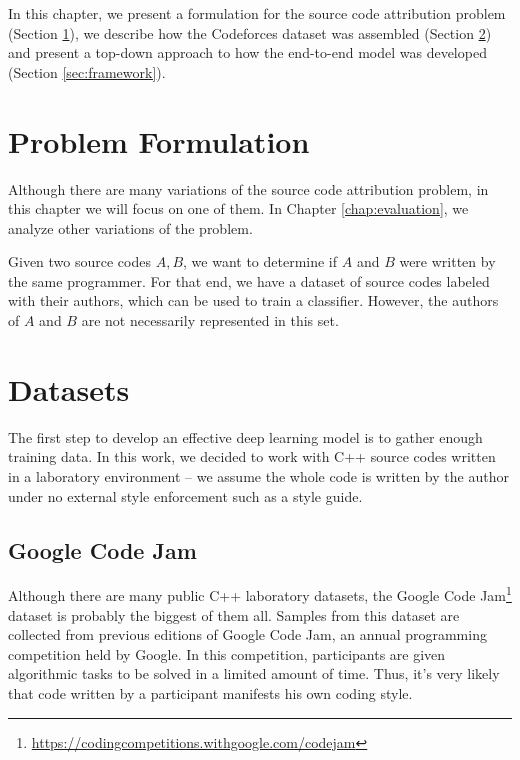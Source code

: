 \label{chap:methodology}

In this chapter, we present a formulation for the source code attribution problem (Section \ref{sec:formulation}), we describe how the Codeforces dataset was assembled (Section \ref{sec:dataset}) and present a top-down approach to how the end-to-end model was developed (Section \ref{sec:framework}).

\section{Problem Formulation}\label{sec:formulation}

Although there are many variations of the source code attribution problem, in this chapter we will focus on one of them. In Chapter \ref{chap:evaluation}, we analyze other variations of the problem.

Given two source codes $A, B$, we want to determine if $A$ and $B$ were written by the same programmer. For that end, we have a dataset of source codes labeled with their authors, which can be used to train a classifier. However, the authors of $A$ and $B$ are not necessarily represented in this set.

\section{Datasets}\label{sec:dataset}

The first step to develop an effective deep learning model is to gather enough training data. In this work, we decided to work with C++ source codes written in a laboratory environment -- we assume the whole code is written by the author under no external style enforcement such as a style guide.

\subsection{Google Code Jam}

Although there are many public C++ laboratory datasets, the Google Code Jam\footnote{\url{https://codingcompetitions.withgoogle.com/codejam}} dataset \cite{caliskan_2015} is probably the biggest of them all. Samples from this dataset are collected from previous editions of Google Code Jam, an annual programming competition held by Google. In this competition, participants are given algorithmic tasks to be solved in a limited amount of time. Thus, it's very likely that code written by a participant manifests his own coding style.

